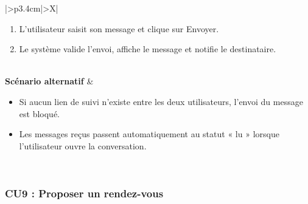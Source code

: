 ﻿\documentclass[a4paper,12pt]{report}
\begin{document}
\begin{table}[H]
\begin{tabularx}{\textwidth}{|>{\RaggedRight\arraybackslash}p{3.4cm}|>{\RaggedRight\arraybackslash}X|}
\begin{minipage}[t]{\linewidth}
\begin{enumerate}[label=\arabic*., leftmargin=*, topsep=0pt, itemsep=1pt]
    \item L'utilisateur saisit son message et clique sur Envoyer.
    \item Le système valide l'envoi, affiche le message et notifie le destinataire.
\end{enumerate}
\vspace{2pt}
\end{minipage} \\
\hline
\textbf{Scénario alternatif} &
\begin{minipage}[t]{\linewidth}\sloppy
\vspace{2pt}
\begin{itemize}[leftmargin=*, topsep=0pt, itemsep=1pt]
    \item Si aucun lien de suivi n'existe entre les deux utilisateurs, l'envoi du message est bloqué.
    \item  Les messages reçus passent automatiquement au statut « lu » lorsque l'utilisateur ouvre la conversation.
\end{itemize}
\vspace{2pt}
\end{minipage} \\
\hline
\end{tabularx}
\fussy
\end{table}
\endgroup


\begingroup
\setlength{\emergencystretch}{3em}
\subsubsection*{CU9 : Proposer un rendez-vous}
\end{document}
